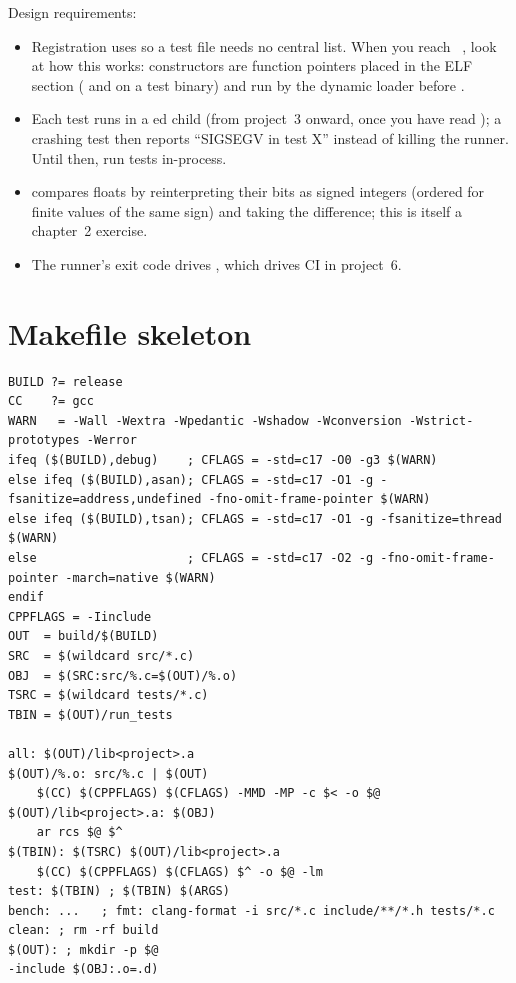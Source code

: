 Design requirements:
\begin{itemize}
  \item Registration uses  so a test file needs no central list. When you reach \csapp\ , look at how this works: constructors are function pointers placed in the ELF  section ( and  on a test binary) and run by the dynamic loader before .
  \item Each test runs in a ed child (from project~3 onward, once you have read ); a crashing test then reports ``SIGSEGV in test X'' instead of killing the runner. Until then, run tests in-process.
  \item {} compares floats by reinterpreting their bits as signed integers (ordered for finite values of the same sign) and taking the difference; this is itself a chapter~2 exercise.
  \item The runner's exit code drives , which drives CI in project~6.
\end{itemize}

\section{Makefile skeleton}

\begin{lstlisting}[style=plain]
BUILD ?= release
CC    ?= gcc
WARN   = -Wall -Wextra -Wpedantic -Wshadow -Wconversion -Wstrict-prototypes -Werror
ifeq ($(BUILD),debug)    ; CFLAGS = -std=c17 -O0 -g3 $(WARN)
else ifeq ($(BUILD),asan); CFLAGS = -std=c17 -O1 -g -fsanitize=address,undefined -fno-omit-frame-pointer $(WARN)
else ifeq ($(BUILD),tsan); CFLAGS = -std=c17 -O1 -g -fsanitize=thread $(WARN)
else                     ; CFLAGS = -std=c17 -O2 -g -fno-omit-frame-pointer -march=native $(WARN)
endif
CPPFLAGS = -Iinclude
OUT  = build/$(BUILD)
SRC  = $(wildcard src/*.c)
OBJ  = $(SRC:src/%.c=$(OUT)/%.o)
TSRC = $(wildcard tests/*.c)
TBIN = $(OUT)/run_tests

all: $(OUT)/lib<project>.a
$(OUT)/%.o: src/%.c | $(OUT)
	$(CC) $(CPPFLAGS) $(CFLAGS) -MMD -MP -c $< -o $@
$(OUT)/lib<project>.a: $(OBJ)
	ar rcs $@ $^
$(TBIN): $(TSRC) $(OUT)/lib<project>.a
	$(CC) $(CPPFLAGS) $(CFLAGS) $^ -o $@ -lm
test: $(TBIN) ; $(TBIN) $(ARGS)
bench: ...   ; fmt: clang-format -i src/*.c include/**/*.h tests/*.c
clean: ; rm -rf build
$(OUT): ; mkdir -p $@
-include $(OBJ:.o=.d)
\end{lstlisting}

